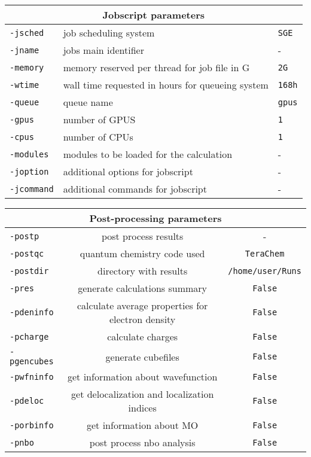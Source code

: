 \begin{tabular}{|l|l|l|}
\hline
\multicolumn{3}{|c|}{\Large \textbf{Jobscript parameters}}\\ \hline                        
\texttt{-jsched} & job scheduling system & \texttt{SGE} \\
\texttt{-jname} & jobs main identifier & - \\
\texttt{-memory} & memory reserved per thread for job file in G & \texttt{2G} \\
\texttt{-wtime} & wall time requested in hours for queueing system  & \texttt{168h} \\
\texttt{-queue} & queue name & \texttt{gpus} \\
\texttt{-gpus} & number of GPUS & \texttt{1} \\
\texttt{-cpus} & number of CPUs  & \texttt{1} \\
\texttt{-modules} &  modules to be loaded for the calculation & - \\
\texttt{-joption} & additional options for jobscript & - \\
\texttt{-jcommand} & additional commands for jobscript & - \\
\hline
\end{tabular}
\begin{tabular}{|l|c|c|}
\hline
\multicolumn{3}{|c|}{\Large\textbf{Post-processing parameters}}\\ \hline
\texttt{-postp} & post process results & - \\
\texttt{-postqc} & quantum chemistry code used & \texttt{TeraChem} \\
\texttt{-postdir} & directory with results & \texttt{/home/user/Runs} \\
\texttt{-pres} & generate calculations summary & \texttt{False} \\
\texttt{-pdeninfo} &  calculate average properties for electron density & \texttt{False} \\
\texttt{-pcharge} &   calculate charges & \texttt{False} \\
\texttt{-pgencubes} & generate cubefiles & \texttt{False} \\
\texttt{-pwfninfo} & get information about wavefunction & \texttt{False} \\
\texttt{-pdeloc} &     get delocalization and localization indices & \texttt{False} \\
\texttt{-porbinfo} & get information about MO & \texttt{False} \\
\texttt{-pnbo} & post process nbo analysis & \texttt{False} \\
\hline
\end{tabular}


